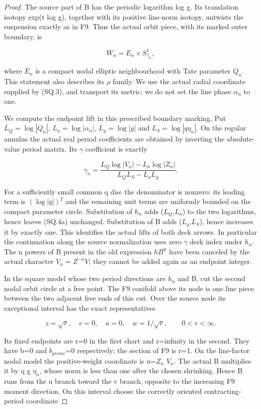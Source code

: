 \begin{proof}
The source part of B has the periodic logarithm log g. Its translation
isotopy exp(t log g), together with its positive line-norm isotopy,
untwists the suspension exactly as in F9. Thus the actual orbit piece,
with its marked outer boundary, is

\[
                     W_n=E_n\times S^1_{\gamma_n},       \tag{SQ.4}
\]

where \(E_{n}\) is a compact nodal elliptic neighbourhood with Tate
parameter \(Q_{n}\). This statement also describes its \(\rho\) family. We use
the actual radial coordinate supplied by (SQ.3), and transport its
metric; we do not set the line phase \(\alpha_{n}\) to one.

We compute the endpoint lift in this prescribed boundary marking.
Put \(L_Q=\log|Q_n|\), \(L_a=\log|\alpha_n|\), \(L_g=\log|g|\) and
\(L_S=\log|q\eta_n|\). On the regular annulus the actual real period
coefficients are obtained by inverting the absolute-value period matrix.
Its \(\gamma\) coefficient is exactly

\[
 \gamma_n=
 \frac{L_Q\log|V_n|-L_a\log|Z_n|}{L_QL_S-L_aL_g}.
                                                        \tag{SQ.4a}
\]

For a sufficiently small common q disc the denominator is nonzero:
its leading term is \((\log|q|)^2\) and the remaining unit terms are
uniformly bounded on the compact parameter circle. Substitution of
\(h_{n}\) adds (\(L_{Q}\),\(L_{a}\)) to the two logarithms, hence leaves (SQ.4a)
unchanged. Substitution of B adds (\(L_{g}\),\(L_{S}\)), hence increases it by
exactly one. This identifies the actual lifts of both deck arrows.
In particular the continuation along the source normalization uses
zero \(\gamma\) deck index under \(h_{n}\). The n powers of B present in the
old expression \(hB^n\) have been canceled by the actual character
\(V_n=Z^{-n}V\); they cannot be added again as an endpoint integer.

In the square model whose two period directions are \(h_{n}\) and B,
cut the second nodal orbit circle at a free point. The F9 conifold
above its node is one line piece between the two adjacent free
ends of this cut. Over the source node its exceptional interval has
the exact representatives

\[
 z=\sqrt r,\quad v=0,\quad u=0,\quad w=1/\sqrt r,
                         \qquad0<r<\infty .             \tag{SQ.4b}
\]

Its fixed endpoints are r=0 in the first chart and r=infinity in
the second. They have b=0 and \(b_{prime}\)=0 respectively; the section
of F9 is r=1. On the line-factor nodal model the positive-weight coordinate is
u=\(Z_{n}\) \(V_{n}\). The actual B multiplies it by q g \(\eta_{n}\), whose
norm is less than one after the chosen shrinking. Hence B runs from
the u branch toward the v branch, opposite to the increasing F9
moment direction. On this interval choose the correctly oriented
contracting-period coordinate


\end{proof}
